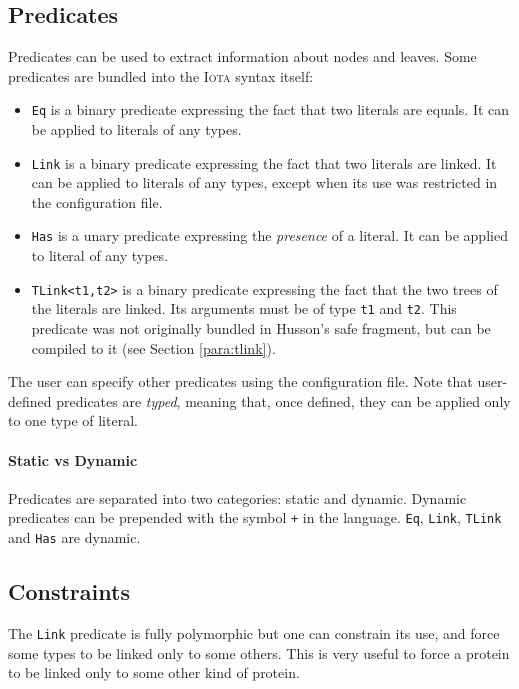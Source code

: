 \documentclass[10pt,a4paper]{article}
\newcommand\Iota{\textsc{Iota}}
\newcommand{\ocaml}{\texttt}
\begin{document}
\subsection{Predicates}
\label{subsec:predicates}
Predicates can be used to extract information about nodes and leaves. Some predicates are bundled into the \Iota{} syntax itself:
\begin{itemize}
\item \ocaml{Eq} is a binary predicate expressing the fact that two literals are equals. It can be applied to literals of any types.
\item \ocaml{Link} is a binary predicate expressing the fact that two literals are linked. It can be applied to literals of any types, except when its use was restricted in the configuration file.
\item \ocaml{Has} is a unary predicate expressing the \emph{presence} of a literal. It can be applied to literal of any types.
\item \ocaml{TLink<t1,t2>} is a binary predicate expressing the fact that the two trees of the literals are linked. Its arguments must be of type \ocaml{t1} and \ocaml{t2}. This predicate was not originally bundled in Husson's safe fragment, but can be compiled to it (see Section \ref{para:tlink}).
\end{itemize}

The user can specify other predicates using the configuration file. Note that user-defined predicates are \emph{typed}, meaning that, once defined, they can be applied only to one type of literal.

\paragraph{Static vs Dynamic}
Predicates are separated into two categories: static and dynamic. Dynamic predicates can be prepended with the symbol \ocaml{+} in the language. \ocaml{Eq}, \ocaml{Link}, \ocaml{TLink} and \ocaml{Has} are dynamic.

\subsection{Constraints}
The \ocaml{Link} predicate is fully polymorphic but one can constrain its use, and force some types to be linked only to some others. This is very useful to force a protein to be linked only to some other kind of protein.
\end{document}
